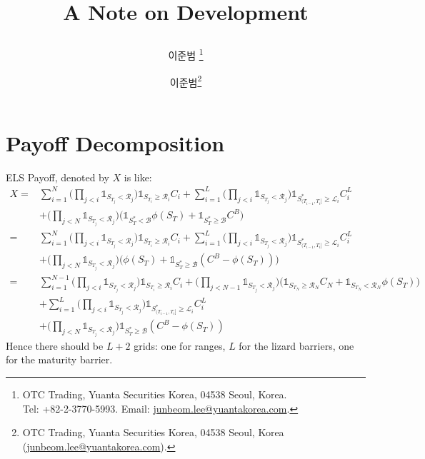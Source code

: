 \documentclass[a4paper, 11pt]{article}              %
\title{A Note on Development  \author{이준범 \thanks{ OTC Trading, Yuanta Securities Korea, 04538
       Seoul, Korea. \\Tel: +82-2-3770-5993. 
       Email: \href{junbeom.lee@yuantakorea.com}{junbeom.lee@yuantakorea.com}.
     }} 
   }
\author{이준범\footnote{OTC Trading, Yuanta Securities
    Korea, 04538 Seoul, Korea
    (\href{junbeom.lee@yuantakorea.com}{junbeom.lee@yuantakorea.com}).
    }}
\date{}
\numberwithin{equation}{section}
\theoremstyle{plain}
\newcommand{\1}{\mathds{1}}
\newcommand{\calB}{\mathcal{B}}
\newcommand{\calR}{\mathcal{R}}
\newcommand{\calL}{\mathcal{L}}
\newcommand{\SUM}{\displaystyle\sum}
\theoremstyle{plain}
\theoremstyle{definition}
\theoremstyle{plain}
\begin{document}
\maketitle

\iffalse
{
  \hypersetup{linkcolor = blue} 
  \tableofcontents
}
\fi
\section{Payoff Decomposition}
\label{sec:back}

ELS Payoff, denoted by $X$ is like:
\begin{align}
  X =& \SUM_{i=1}^N \Big(\prod_{j <i}\1_{S_{T_j} < \calR_j}\Big)\1_{ S_{T_i}
      \geq  \calR_i}C_i
      + \SUM_{i=1}^L\Big(\prod_{j <i}\1_{S_{T_j} < \calR_j}\Big)
      \1_{ S^*_{(T_{i-1} , T_i]} \geq  \calL_i}C^L_i \nonumber \\
     &+\Big(\prod_{j <N}\1_{S_{T_j} < \calR_j}\Big)\big(\1_{S^*_T <
       \calB}\phi(S_T)+\1_{S^*_T \geq \calB}C^B\big)  \nonumber \\
  =& \SUM_{i=1}^N \Big(\prod_{j <i}\1_{S_{T_j} < \calR_j}\Big)\1_{ S_{T_i}
      \geq  \calR_i}C_i
      + \SUM_{i=1}^L\Big(\prod_{j <i}\1_{S_{T_j} < \calR_j}\Big)
      \1_{ S^*_{(T_{i-1} , T_i]} \geq  \calL_i}C^L_i \nonumber \\
     &+\Big(\prod_{j <N}\1_{S_{T_j} < \calR_j}\Big)\big(\phi(S_T)+\1_{S^*_T \geq
       \calB}(C^B-\phi(S_T))\big)
       \nonumber \\
    =& \SUM_{i=1}^{N-1} \Big(\prod_{j <i}\1_{S_{T_j} < \calR_j}\Big)\1_{ S_{T_i}
       \geq  \calR_i}C_i+\Big(\prod_{j <N-1}\1_{S_{T_j} < \calR_j}\Big)
       \big(\1_{S_{T_N} \geq \calR_N}C_N + \1_{S_{T_N} < \calR_N}\phi(S_T)\big)
        \nonumber \\
     &+ \SUM_{i=1}^L\Big(\prod_{j <i}\1_{S_{T_j} < \calR_j}\Big)
       \1_{ S^*_{(T_{i-1} , T_i]} \geq  \calL_i}C^L_i \nonumber\\
     &+\Big(\prod_{j <N}\1_{S_{T_j} < \calR_j}\Big)\1_{S^*_T \geq \calB}(C^B-\phi(S_T))
\end{align}
Hence there should be $L+2$ grids: one for ranges, $L$ for the lizard barriers, one
for the maturity barrier. 
\end{document}
